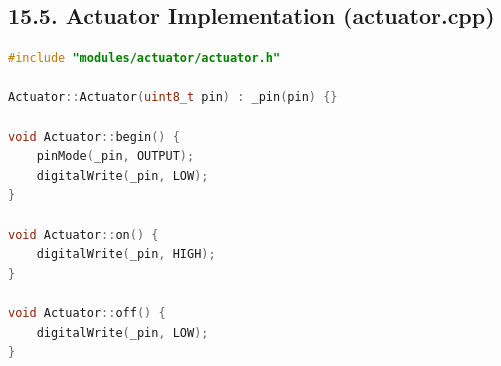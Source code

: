 \documentclass[12pt]{article}
\begin{document}
\subsection*{15.5. Actuator Implementation (actuator.cpp)}

\begin{lstlisting}[language=C++, caption=actuator.cpp - Actuator Driver Implementation]
#include "modules/actuator/actuator.h"

Actuator::Actuator(uint8_t pin) : _pin(pin) {}

void Actuator::begin() {
    pinMode(_pin, OUTPUT);
    digitalWrite(_pin, LOW);
}

void Actuator::on() {
    digitalWrite(_pin, HIGH);
}

void Actuator::off() {
    digitalWrite(_pin, LOW);
}
\end{lstlisting}
\end{document}
